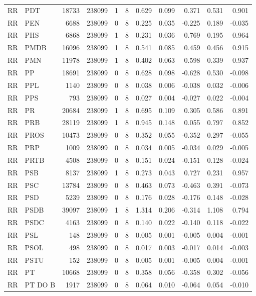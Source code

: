 \begin{landscape}
\begin{longtable}{llrrrrrrrrr}
RR & PDT & 18733 & 238099 & 1 & 8 & 0.629 & 0.099 & 0.371 & 0.531 & 0.901 \\
RR & PEN & 6688 & 238099 & 0 & 8 & 0.225 & 0.035 & -0.225 & 0.189 & -0.035 \\
RR & PHS & 6868 & 238099 & 1 & 8 & 0.231 & 0.036 & 0.769 & 0.195 & 0.964 \\
RR & PMDB & 16096 & 238099 & 1 & 8 & 0.541 & 0.085 & 0.459 & 0.456 & 0.915 \\
RR & PMN & 11978 & 238099 & 1 & 8 & 0.402 & 0.063 & 0.598 & 0.339 & 0.937 \\
RR & PP & 18691 & 238099 & 0 & 8 & 0.628 & 0.098 & -0.628 & 0.530 & -0.098 \\
RR & PPL & 1140 & 238099 & 0 & 8 & 0.038 & 0.006 & -0.038 & 0.032 & -0.006 \\
RR & PPS & 793 & 238099 & 0 & 8 & 0.027 & 0.004 & -0.027 & 0.022 & -0.004 \\
RR & PR & 20684 & 238099 & 1 & 8 & 0.695 & 0.109 & 0.305 & 0.586 & 0.891 \\
RR & PRB & 28119 & 238099 & 1 & 8 & 0.945 & 0.148 & 0.055 & 0.797 & 0.852 \\
RR & PROS & 10473 & 238099 & 0 & 8 & 0.352 & 0.055 & -0.352 & 0.297 & -0.055 \\
RR & PRP & 1009 & 238099 & 0 & 8 & 0.034 & 0.005 & -0.034 & 0.029 & -0.005 \\
RR & PRTB & 4508 & 238099 & 0 & 8 & 0.151 & 0.024 & -0.151 & 0.128 & -0.024 \\
RR & PSB & 8137 & 238099 & 1 & 8 & 0.273 & 0.043 & 0.727 & 0.231 & 0.957 \\
RR & PSC & 13784 & 238099 & 0 & 8 & 0.463 & 0.073 & -0.463 & 0.391 & -0.073 \\
RR & PSD & 5239 & 238099 & 0 & 8 & 0.176 & 0.028 & -0.176 & 0.148 & -0.028 \\
RR & PSDB & 39097 & 238099 & 1 & 8 & 1.314 & 0.206 & -0.314 & 1.108 & 0.794 \\
RR & PSDC & 4163 & 238099 & 0 & 8 & 0.140 & 0.022 & -0.140 & 0.118 & -0.022 \\
RR & PSL & 148 & 238099 & 0 & 8 & 0.005 & 0.001 & -0.005 & 0.004 & -0.001 \\
RR & PSOL & 498 & 238099 & 0 & 8 & 0.017 & 0.003 & -0.017 & 0.014 & -0.003 \\
RR & PSTU & 152 & 238099 & 0 & 8 & 0.005 & 0.001 & -0.005 & 0.004 & -0.001 \\
RR & PT & 10668 & 238099 & 0 & 8 & 0.358 & 0.056 & -0.358 & 0.302 & -0.056 \\
RR & PT DO B & 1917 & 238099 & 0 & 8 & 0.064 & 0.010 & -0.064 & 0.054 & -0.010 \\

\end{longtable}
\end{landscape}

